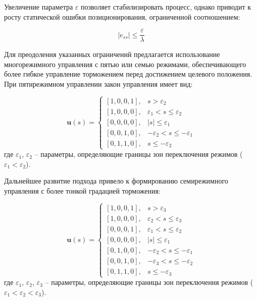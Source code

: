 Увеличение параметра $\varepsilon$ позволяет стабилизировать процесс, однако приводит к
росту статической ошибки позиционирования, ограниченной соотношением:

\begin{equation*}
	|e_{ss}| \leq \frac{\varepsilon}{\lambda}
\end{equation*}

Для преодоления указанных ограничений предлагается использование многорежимного управления
с пятью или семью режимами, обеспечивающего более гибкое управление торможением
перед достижением целевого положения. При пятирежимном управлении закон управления имеет вид:

\begin{equation}\label{eq:control_law_5_mode}
	\mathbf{u}(s) = \begin{cases}
		[1,0,0,1], & s > \varepsilon_2                      \\
		[1,0,0,0], & \varepsilon_1 < s \leq \varepsilon_2   \\
		[0,0,0,0], & |s| \leq \varepsilon_1                 \\
		[0,0,1,0], & -\varepsilon_2 < s \leq -\varepsilon_1 \\
		[0,1,1,0], & s \leq -\varepsilon_2
	\end{cases}
\end{equation}
где $\varepsilon_1$, $\varepsilon_2$ -- параметры, определяющие границы зон переключения режимов ($\varepsilon_1 < \varepsilon_2$).

Дальнейшее развитие подхода привело к формированию семирежимного управления с более тонкой градацией торможения:

\begin{equation}\label{eq:control_law_7_mode}
	\mathbf{u}(s) = \begin{cases}
		[1,0,0,1], & s > \varepsilon_3                      \\
		[1,0,0,0], & \varepsilon_2 < s \leq \varepsilon_3   \\
		[0,0,0,1], & \varepsilon_1 < s \leq \varepsilon_2   \\
		[0,0,0,0], & |s| \leq \varepsilon_1                 \\
		[0,1,0,0], & -\varepsilon_2 < s \leq -\varepsilon_1 \\
		[0,0,1,0], & -\varepsilon_3 < s \leq -\varepsilon_2 \\
		[0,1,1,0], & s \leq -\varepsilon_3
	\end{cases}
\end{equation}
где $\varepsilon_1$, $\varepsilon_2$, $\varepsilon_3$ -- параметры, определяющие границы зон переключения режимов ($\varepsilon_1 < \varepsilon_2 < \varepsilon_3$).

